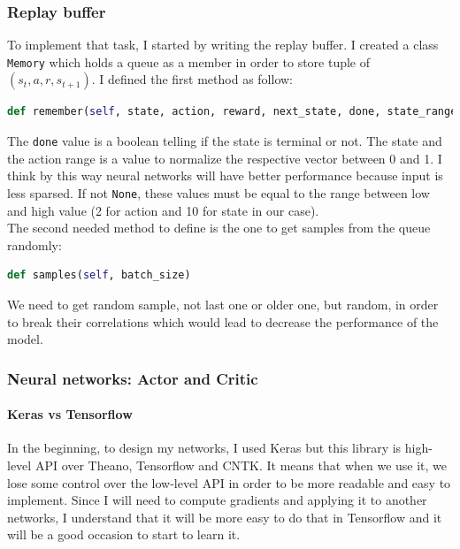 \documentclass{article}
\begin{document}
\subsubsection{Replay buffer}

To implement that task, I started by writing the replay buffer. I created a
class \verb?Memory? which holds a queue as a member in order to store tuple of
$(s_t, a, r, s_{t+1})$. I defined the first method as follow:

\begin{lstlisting}[language=Python]
def remember(self, state, action, reward, next_state, done, state_range=None, action_range=None)
\end{lstlisting}

The \verb?done? value is a boolean telling if the state is terminal or not. The
state and the action range is a value to normalize the respective vector between
0 and 1. I think by this way neural networks will have better performance
because input is less sparsed. If not \verb?None?, these values must be equal to
the range between low and high value (2 for action and 10 for state in our
case).\\
The second needed method to define is the one to get samples from the queue randomly:

\begin{lstlisting}[language=Python]
def samples(self, batch_size)
\end{lstlisting}

We need to get random sample, not last one or older one, but random, in order to
break their correlations which would lead to decrease the performance of the model.

\subsubsection{Neural networks: Actor and Critic}

\paragraph{Keras vs Tensorflow}

In the beginning, to design my networks, I used Keras but this library is
high-level API over Theano, Tensorflow and CNTK. It means that when we use it,
we lose some control over the low-level API in order to be more readable and
easy to implement. Since I will need to compute gradients and applying it to
another networks, I understand that it will be more easy to do that in
Tensorflow and it will be a good occasion to start to learn it.
\end{document}

